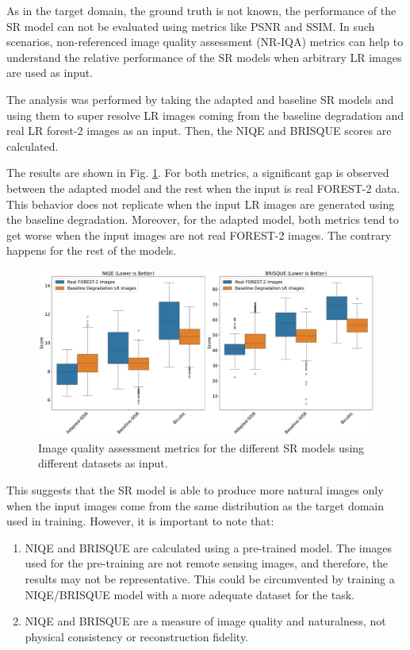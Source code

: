     As in the target domain, the ground truth is not known, the performance of the SR model can not be evaluated using metrics like PSNR and SSIM.
    In such scenarios, non-referenced image quality assessment (NR-IQA) metrics can help to understand the relative performance of the SR models when arbitrary LR images are used as input.
    
    The analysis was performed by taking the adapted and baseline SR models and using them to super resolve LR images coming from the baseline degradation and real LR forest-2 images as an input.
    Then, the NIQE and BRISQUE scores are calculated.
    
    The results are shown in Fig. \ref{fig:5-target-iqa-results}.
    For both metrics, a significant gap is observed between the adapted model and the rest when the input is real FOREST-2 data.
    This behavior does not replicate when the input LR images are generated using the baseline degradation. Moreover, for the adapted model, both metrics tend to get worse when the input images are not real FOREST-2 images. The contrary happens for the rest of the models.

    \begin{figure}[H]
        \centering
        \includegraphics[scale=0.25]{Includes/5-target-iqa-results.pdf}
        \caption{Image quality assessment metrics for the different SR models using different datasets as input. }
        \label{fig:5-target-iqa-results}
    \end{figure}

    
    This suggests that the SR model is able to produce more natural images only when the input images come from the same distribution as the target domain used in training. However, it is important to note that: 

    


    \begin{enumerate}
        \item NIQE and BRISQUE are calculated using a pre-trained model. The images used for the pre-training are not remote sensing images, and therefore, the results may not be representative. This could be circumvented by training a NIQE/BRISQUE model with a more adequate dataset for the task.
        \item NIQE and BRISQUE are a measure of image quality and naturalness, not physical consistency or reconstruction fidelity.
    \end{enumerate}

